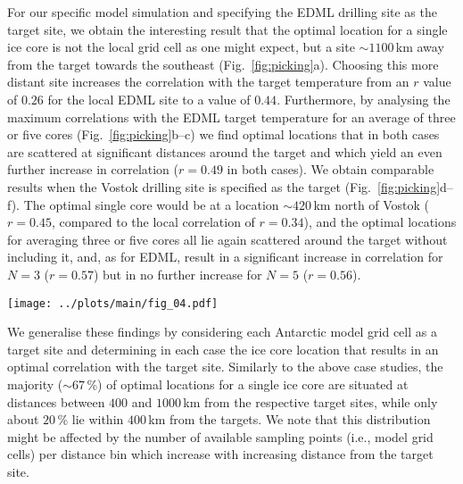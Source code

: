 \documentclass[draft]{agujournal2019}
\begin{document}
For our specific model simulation and specifying the EDML drilling site as the
target site, we obtain the interesting result that the optimal location for a
single ice core is not the local grid cell as one might expect, but a site
$\sim1100$\,km away from the target towards the southeast
(Fig.~\ref{fig:picking}a). Choosing this more distant site increases the
correlation with the target temperature from an $r$ value of $0.26$ for the
local EDML site to a value of $0.44$. Furthermore, by analysing the maximum
correlations with the EDML target temperature for an average of three or five
cores (Fig.~\ref{fig:picking}b--c) we find optimal locations that in both cases
are scattered at significant distances around the target and which yield an even
further increase in correlation ($r=0.49$ in both cases). We obtain comparable
results when the Vostok drilling site is specified as the target
(Fig.~\ref{fig:picking}d--f). The optimal single core would be at a location
$\sim420$\,km north of Vostok ($r=0.45$, compared to the local correlation of
$r=0.34$), and the optimal locations for averaging three or five cores all lie
again scattered around the target without including it, and, as for EDML, result
in a significant increase in correlation for $N=3$ ($r=0.57$) but in no further
increase for $N=5$ ($r=0.56$).

\begin{figure*}[t]%
\centering
\texttt{[image: ../plots/main/fig\_04.pdf]}
\caption[Picking optimal sites]{%
  Choosing ice-core locations that optimally reconstruct interannual
  temperatures at the EDML and Vostok drilling sites. The maps show the
  correlation coefficient in the climate model data between the annual
  temperature time series at the target sites (black crosses) EDML
  (\textbf{a}--\textbf{c}) and Vostok (\textbf{d}--\textbf{f}) with the time
  series fields of precipitation-weighted oxygen isotope composition. Filled
  black circles denote grid cells that maximise the correlation between the
  target site temperature and either a single grid cell ($N=1$; \textbf{a},
  \textbf{d}) or for an average across $N=3$ (\textbf{b}, \textbf{e}) or $N=5$
  (\textbf{c}, \textbf{f}) grid cells. Interestingly, non-local ice-core
  locations systematically show the strongest relationship with the target site
  temperature.}
\label{fig:picking}%
\end{figure*}%

We generalise these findings by considering each Antarctic model grid cell as a
target site and determining in each case the ice core location that results in
an optimal correlation with the target site. Similarly to the above case
studies, the majority ($\sim67$\,\%) of optimal locations for a single ice core
are situated at distances between $400$ and $1000$\,km from the respective
target sites, while only about $20$\,\% lie within $400$\,km from the
targets. We note that this distribution might be affected by the number of
available sampling points (i.e., model grid cells) per distance bin which
increase with increasing distance from the target site.
\end{document}
